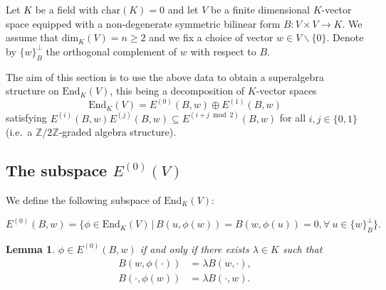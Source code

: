 \documentclass{amsart}
\theoremstyle{plain}
\newtheorem{lemma}[theorem]{Lemma}
\theoremstyle{definition}
\begin{document}
Let $K$ be a field with $\text{char}(K) = 0$ and let $V$ be a finite dimensional $K$-vector space equipped with a non-degenerate symmetric bilinear form $B: V\times V \rightarrow K$. We assume that $\text{dim}_K(V) = n\geq 2$ and we fix a choice of vector $w\in V\backslash\{0\}$. Denote by $\{w\}_B^{\perp}$ the orthogonal complement of $w$ with respect to $B$. 

The aim of this section is to use the above data to obtain a superalgebra structure on $\text{End}_K(V)$, this being a decomposition of $K$-vector spaces \[\text{End}_K(V) = E^{(0)}(B,w)\oplus E^{(1)}(B,w)\] satisfying $E^{(i)}(B,w)E^{(j)}(B,w)\subseteq E^{(i+j \bmod 2)}(B,w)$ for all $i,j\in\{0,1\}$ (i.e.\ a  $\mathbb{Z}/2\mathbb{Z}$-graded algebra structure).

\subsection{The subspace $E^{(0)}(V)$}

We define the following subspace of $\text{End}_K(V)$:

\begin{equation*}
    E^{(0)}(B,w) = \{ \phi \in \text{End}_K(V) \,|\, B(u, \phi(w)) = B(w, \phi(u)) = 0, \forall \ u \in \{w\}_B^\perp\}.
\end{equation*}

\begin{lemma}
\label{lemma:equivSn}
$\phi \in E^{(0)}(B,w)$ if and only if there exists $\lambda\in K$ such that
\begin{align*}
    B(w,\phi(\cdot))&=\lambda B(w,\cdot), \\
    B(\cdot,\phi(w))&=\lambda B(\cdot,w).
\end{align*}
\end{lemma}
\end{document}
